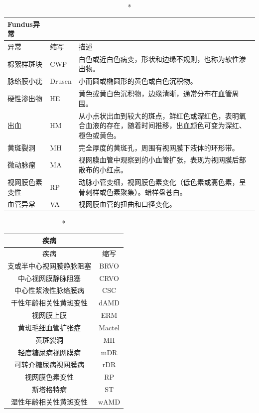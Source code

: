 \documentclass{article}
\begin{document}
	{
		\fontsize{9}{12}\selectfont
		{
			\begin{longtable}{llp{11.2cm}}
				\caption*{Fundus异常}
				\label{tb:fundus-ab}\\
				\toprule
				异常&缩写&描述\\
				\toprule
				
				棉絮样斑块
				& CWP
				& 白色或近白色病变，形状和边缘不规则，也称为软性渗出物。\\
				
				脉络膜小疣
				& Drusen
				& 小而圆或椭圆形的黄色或白色沉积物。\\
				
				硬性渗出物
				& HE
				& 黄色或黄白色沉积物，边缘清晰，通常分布在血管周围。\\
				
				出血
				& HM
				& 从小点状出血到较大的斑点，鲜红色或深红色，表明氧合血液的存在，随着时间推移，出血颜色可变为深红、橙色或黄色。\\
				
				黄斑裂洞
				& MH
				& 完全厚度的黄斑孔，周围有视网膜下液体的环形带。\\
				
				微动脉瘤
				& MA
				& 视网膜血管中观察到的小血管扩张，表现为视网膜后部散布的小红点。\\

				视网膜色素变性
				& RP
				& 动脉小管变细，视网膜色素变化（低色素或高色素，呈骨刺样或色素聚集）。蜡样盘苍白。\\

				血管异常
				& VA
				& 视网膜血管的扭曲和口径变化。\\
				
				\bottomrule
			\end{longtable}
		}
	}
	
	\pagebreak
	
	{
		\fontsize{9}{12}\selectfont
		{
			\begin{longtable}{cc}
				\caption*{疾病}
				\label{tb:diseases}\\
				\toprule
				疾病&缩写\\
				\toprule
				
				支或半中心视网膜静脉阻塞&BRVO\\
				中心视网膜静脉阻塞&CRVO\\
				中心性浆液性脉络膜病&CSC\\
				干性年龄相关性黄斑变性&dAMD\\
				视网膜上膜&ERM\\
				黄斑毛细血管扩张症&Mactel\\
				黄斑裂洞&MH\\
				轻度糖尿病视网膜病&mDR\\
				可转介糖尿病视网膜病&rDR\\
				视网膜色素变性&RP\\
				斯塔格特病&ST\\
				湿性年龄相关性黄斑变性&wAMD\\
				\bottomrule
			\end{longtable}
		}
	}
	
\end{document}
